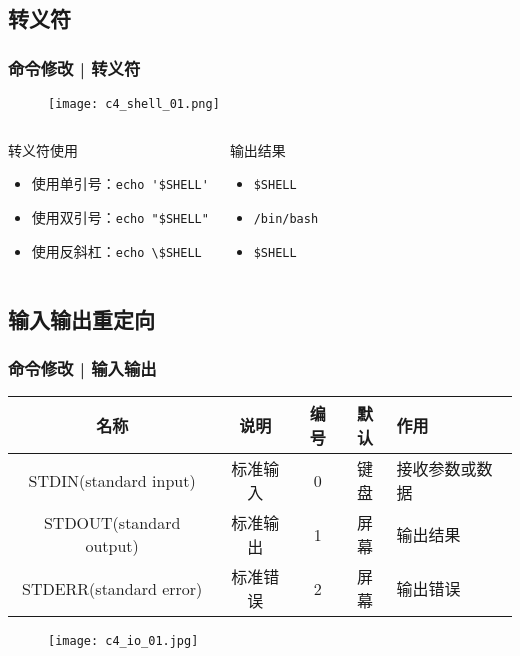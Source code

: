 \subsection{转义符}
\begin{frame}[fragile]
  \frametitle{命令修改 | \alert{转义符}}
  \begin{figure}
    \centering
    \texttt{[image: c4\_shell\_01.png]}
  \end{figure}
  \pause
  \begin{columns}
  \begin{block}{转义符使用}
    \begin{itemize}
      \item 使用单引号：\verb|echo '$SHELL'|
      \item 使用双引号：\verb|echo "$SHELL"|
      \item 使用反斜杠：\verb|echo \$SHELL|
    \end{itemize}
  \end{block}
    \pause
    \pause
    \begin{block}{输出结果}
      \begin{itemize}
        \item \verb|$SHELL|
        \item \verb|/bin/bash|
        \item \verb|$SHELL|
      \end{itemize}
    \end{block}
  \end{columns}
\end{frame}

\subsection{输入输出重定向}
\begin{frame}
  \frametitle{命令修改 | \alert{输入输出}}
  \begin{table}
    \centering
    \begin{tabular}{ccccl}
      \hline
      \rowcolor{blue!50}名称 & 说明 & 编号 & 默认 & 作用\\
      \hline
      STDIN(standard input) & 标准输入 & 0 & 键盘 & 接收参数或数据\\
      STDOUT(standard output) & 标准输出 & 1 & 屏幕 & 输出结果\\
      STDERR(standard error) & 标准错误 & 2 & 屏幕 & 输出错误\\
      \hline
    \end{tabular}
  \end{table}
  \begin{figure}
    \centering
    \texttt{[image: c4\_io\_01.jpg]}
  \end{figure}
\end{frame}

